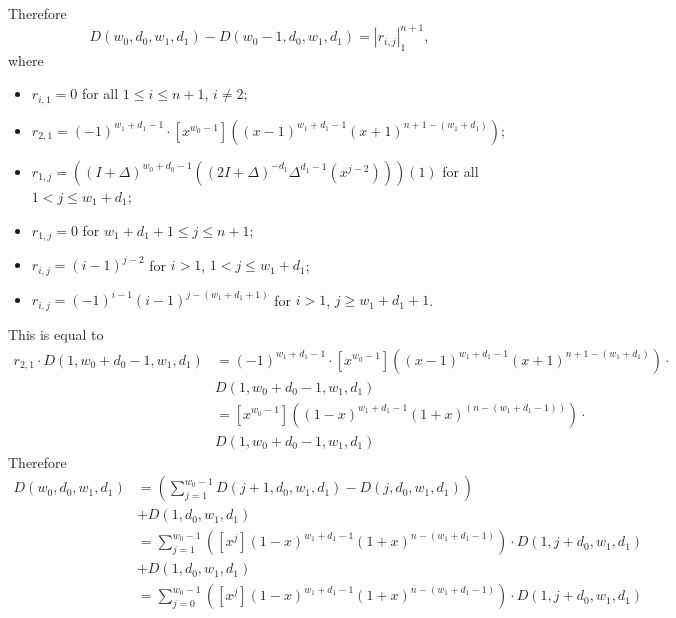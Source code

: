\documentclass[10pt,reqno]{amsart}
\theoremstyle{plain}
\theoremstyle{definition}
\theoremstyle{remark}
\def\determinant#1{\left|#1\right|}
\begin{document}
Therefore
\begin{equation}D(w_0,d_0,w_1,d_1)-D(w_0-1,d_0,w_1,d_1) = 
\determinant{r_{i,j}}_1^{n+1},\end{equation}
where
\begin{itemize}
\item $r_{i,1} = 0$ for all $1\leq i\leq n+1$, $i\ne 2$;
\item $r_{2,1} = (-1)^{w_1+d_1-1}\cdot
[x^{w_0-1}]((x-1)^{w_1+d_1-1} (x+1)^{n+1-(w_1+d_1)})$;
\item $r_{1,j} = 
((I+\Delta)^{w_0+d_0-1}((2I+\Delta)^{-d_1}\Delta^{d_1-1}(x^{j-2})))(1)$
for all $1<j\leq w_1+d_1$;
\item $r_{1,j} = 0$ for $w_1+d_1+1\leq j\leq n+1$;
\item $r_{i,j} = (i-1)^{j-2}$ for $i>1$, $1<j\leq w_1+d_1$;
\item $r_{i,j} = (-1)^{i-1} (i-1)^{j-(w_1+d_1+1)}$ for $i>1$, $j\geq w_1+d_1+1$.
\end{itemize}

This is equal to \begin{equation}
\begin{aligned}
r_{2,1}\cdot D(1,w_0+d_0-1,w_1,d_1) &=
(-1)^{w_1+d_1-1}\cdot 
[x^{w_0-1}]((x-1)^{w_1+d_1-1} (x+1)^{n+1-(w_1+d_1)})\cdot \\
&D(1,w_0+d_0-1,w_1,d_1)\\
&=
[x^{w_0-1}]((1-x)^{w_1+d_1-1}(1+x)^{(n-(w_1+d_1-1))})\cdot \\
&D(1,w_0+d_0-1,w_1,d_1)
\end{aligned}
\end{equation}
Therefore
\begin{equation}
\label{eq:nye}
\begin{aligned}
D(w_0,d_0,w_1,d_1) &=
  (\sum_{j=1}^{w_0-1} D(j+1,d_0,w_1,d_1)-D(j,d_0,w_1,d_1)) \\
  &+ D(1,d_0,w_1,d_1) \\
&=  \sum_{j=1}^{w_0-1} ([x^j](1-x)^{w_1+d_1-1}(1+x)^{n-(w_1+d_1-1)})\cdot
		     D(1,j+d_0,w_1,d_1)\\
&+ D(1,d_0,w_1,d_1)\\
&= \sum_{j=0}^{w_0-1} ([x^j](1-x)^{w_1+d_1-1}(1+x)^{n-(w_1+d_1-1)})\cdot
		     D(1,j+d_0,w_1,d_1)
\end{aligned}
\end{equation}
\end{document}
